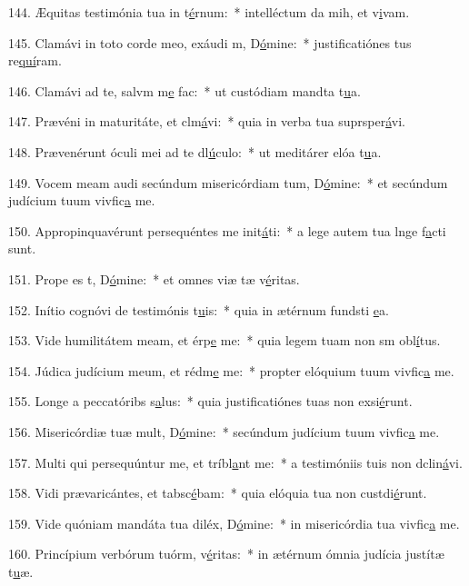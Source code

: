 144. Æquitas testimónia tua in t\uline{é}rnum:~* intelléctum da mih, et v\uline{i}vam.\par 
145. Clamávi in toto corde meo, exáudi m, D\uline{ó}mine:~* justificatiónes tus re\uline{quí}ram.\par 
146. Clamávi ad te, salvm m\uline{e} fac:~* ut custódiam mandta t\uline{u}a.\par 
147. Prævéni in maturitáte, et clm\uline{á}vi:~* quia in verba tua suprsper\uline{á}vi.\par 
148. Prævenérunt óculi mei ad te dl\uline{ú}culo:~* ut meditárer elóa t\uline{u}a.\par 
149. Vocem meam audi secúndum misericórdiam tum, D\uline{ó}mine:~* et secúndum judícium tuum vivfic\uline{a} me.\par 
150. Appropinquavérunt persequéntes me init\uline{á}ti:~* a lege autem tua lnge f\uline{a}cti sunt.\par 
151. Prope es t, D\uline{ó}mine:~* et omnes viæ tæ v\uline{é}ritas.\par 
152. Inítio cognóvi de testimónis t\uline{u}is:~* quia in ætérnum fundsti \uline{e}a.\par 
153. Vide humilitátem meam, et érp\uline{e} me:~* quia legem tuam non sm obl\uline{í}tus.\par 
154. Júdica judícium meum, et rédm\uline{e} me:~* propter elóquium tuum vivfic\uline{a} me.\par 
155. Longe a peccatóribs s\uline{a}lus:~* quia justificatiónes tuas non exsi\uline{é}runt.\par 
156. Misericórdiæ tuæ mult, D\uline{ó}mine:~* secúndum judícium tuum vivfic\uline{a} me.\par 
157. Multi qui persequúntur me, et tríbl\uline{a}nt me:~* a testimóniis tuis non dclin\uline{á}vi.\par 
158. Vidi prævaricántes, et tabsc\uline{é}bam:~* quia elóquia tua non custdi\uline{é}runt.\par 
159. Vide quóniam mandáta tua diléx, D\uline{ó}mine:~* in misericórdia tua vivfic\uline{a} me.\par 
160. Princípium verbórum tuórm, v\uline{é}ritas:~* in ætérnum ómnia judícia justítæ t\uline{u}æ.\par 
